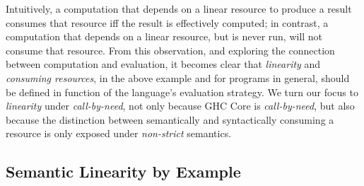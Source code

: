 \documentclass[acmsmall,review]{acmart}
\begin{document}
Intuitively, a computation that depends on a linear resource to produce a
result consumes that resource iff the result is effectively computed; in
contrast, a computation that depends on a linear resource, but is never run,
will not consume that resource.
%
From this observation, and exploring the connection between computation and evaluation,
it becomes clear that \emph{linearity} and \emph{consuming resources}, in the
above example and for programs in general, should be defined in function of the
language's evaluation strategy.
%
We turn our focus to \emph{linearity} under \emph{call-by-need}, not only
because GHC Core is \emph{call-by-need}, but also because the distinction
between semantically and syntactically consuming a resource is only exposed
under \emph{non-strict} semantics.
%

% 
% 
% 

\subsection{Semantic Linearity by Example\label{sec:semantic-linearity-examples}}
\end{document}
